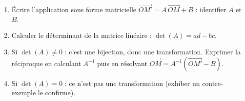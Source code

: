 \documentclass[11pt]{article}
\begin{document}
\begin{methode}
\begin{enumerate}
\item Écrire l'application sous forme matricielle $\overrightarrow{OM'} = A\,\overrightarrow{OM} + B$ : identifier $A$ et $B$.
\item Calculer le déterminant de la matrice linéaire : $\det(A) = ad - bc$.
\item Si $\det(A) \neq 0$ : c'est une bijection, donc une transformation. Exprimer la réciproque en calculant $A^{-1}$ puis en résolvant $\overrightarrow{OM} = A^{-1}\left(\overrightarrow{OM'} - B\right)$.
\item Si $\det(A) = 0$ : ce n'est pas une transformation (exhiber un contre-exemple le confirme).
\end{enumerate}
\end{methode}
\end{document}
